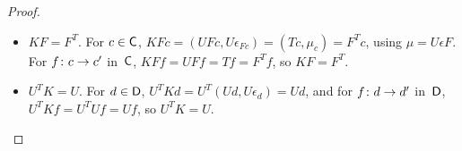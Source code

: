 \documentclass[../../solutions]{subfiles}
\begin{document}
\begin{proof}
\begin{itemize}
  \item $KF=F^T$.  For $c\in{\mathsf{C}}$,
    $KFc=(UFc,U\epsilon_{Fc})=(Tc,\mu_c)=F^Tc$, using $\mu=U\epsilon
    F$.  For ${f}\colon{c}\to{c'}$ in~${\mathsf{C}}$, $KFf=UFf=Tf=F^Tf$, so
    $KF=F^T$.

  \item $U^TK=U$.  For $d\in{\mathsf{D}}$, $U^TKd=U^T(Ud,U\epsilon_d)=Ud$, and
    for ${f}\colon{d}\to{d'}$ in~${\mathsf{D}}$, $U^TKf=U^TUf=Uf$, so $U^TK=U$.
  \end{itemize}
\end{proof}
\end{document}
